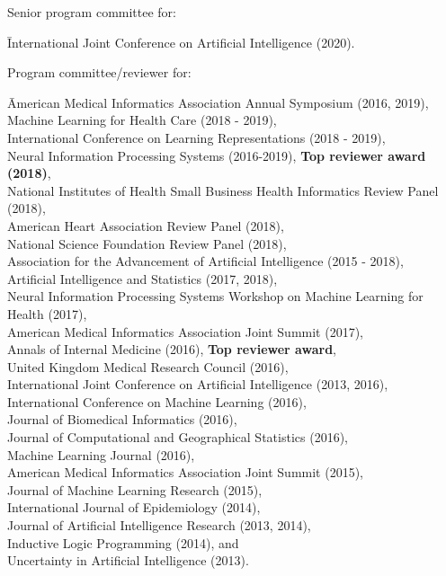 Senior program committee for:  \vspace*{-0.5em}
\begin{tabbing}
\hspace*{2em}\= International Joint Conference on Artificial Intelligence (2020).
\end{tabbing}

Program committee/reviewer for: \vspace*{-0.5em}
\begin{tabbing}
\hspace*{2em}\= American Medical Informatics Association Annual Symposium (2016, 2019),\\
\> Machine Learning for Health Care (2018 - 2019),\\
\> International Conference on Learning Representations (2018 - 2019),\\
\> Neural Information Processing Systems (2016-2019), \textbf{Top reviewer award (2018)},\\
\> National Institutes of Health Small Business Health Informatics Review Panel (2018), \\
\> American Heart Association Review Panel (2018), \\
\> National Science Foundation Review Panel (2018),\\
\> Association for the Advancement of Artificial Intelligence (2015 - 2018),\\
\> Artificial Intelligence and Statistics (2017, 2018),\\
\> Neural Information Processing Systems Workshop on Machine Learning for Health (2017), \\
\> American Medical Informatics Association Joint Summit (2017),\\
\> Annals of Internal Medicine (2016), \textbf{Top reviewer award},\\
\> United Kingdom Medical Research Council (2016),\\
\> International Joint Conference on Artificial Intelligence (2013, 2016),\\
\> International Conference on Machine Learning (2016),\\
\> Journal of Biomedical Informatics (2016), \\
\> Journal of Computational and Geographical Statistics (2016),\\
\> Machine Learning Journal (2016),\\
\> American Medical Informatics Association Joint Summit (2015),\\
\> Journal of Machine Learning Research (2015),\\
\> International Journal of Epidemiology (2014),\\
\> Journal of Artificial Intelligence Research (2013, 2014),\\
\> Inductive Logic Programming (2014), and \\
\> Uncertainty in Artificial Intelligence (2013).
\end{tabbing}

